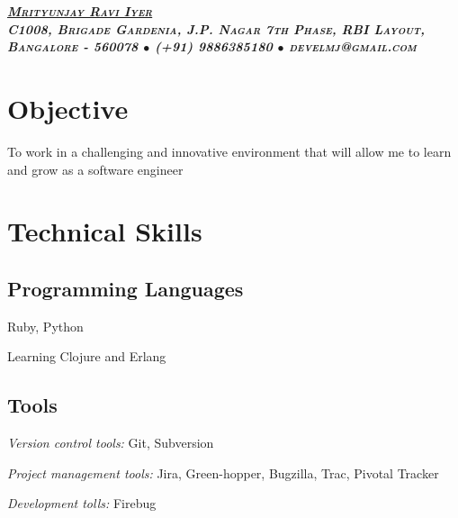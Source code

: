 \documentclass[a4paper,11pt]{article}
\begin{document}
\begin{center}{\Large{\textsc{\textsl{\bf{\underline{Mrityunjay Ravi
          Iyer}}\\\tiny{C1008, Brigade Gardenia, J.P. Nagar 7th Phase,
          RBI Layout, Bangalore - 560078 $\bullet$ (+91) 9886385180
          $\bullet$ develmj@gmail.com}}}}}
\end{center}
\section{Objective}
To work in a challenging and innovative environment that will allow me
to learn and grow as a software engineer

\section{Technical Skills}
\subsection{Programming Languages}
\begin{itemize}
\footnotesize{
  \item[\footnotesize$\bullet$] Ruby, Python
  \item[\footnotesize$\bullet$] Learning Clojure and Erlang
}
\end{itemize}

\subsection{Tools}
\begin{itemize}
\footnotesize{
  \item[\footnotesize$\bullet$] \textsl{Version control tools:} Git, Subversion
  \item[\footnotesize$\bullet$] \textsl{Project management tools:} Jira, Green-hopper, Bugzilla, Trac,
    Pivotal Tracker
  \item[\footnotesize$\bullet$] \textsl{Development tolls:} Firebug
}
\end{itemize}
\end{document}

